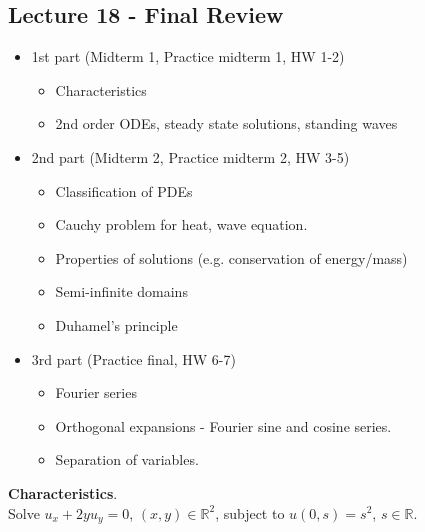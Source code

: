 \documentclass[12pt, letterpaper]{article}
\begin{document}
\subsection{Lecture 18 - Final Review}
\begin{itemize}
    \item 1st part (Midterm 1, Practice midterm 1, HW 1-2)
    \begin{itemize}
        \item Characteristics
        \item 2nd order ODEs, steady state solutions, standing waves
    \end{itemize}
    \item 2nd part (Midterm 2, Practice midterm 2, HW 3-5)
    \begin{itemize}
        \item Classification of PDEs
        \item Cauchy problem for heat, wave equation.
        \item Properties of solutions (e.g. conservation of energy/mass)
        \item Semi-infinite domains
        \item Duhamel's principle
    \end{itemize}
    \item 3rd part (Practice final, HW 6-7)
    \begin{itemize}
        \item Fourier series
        \item Orthogonal expansions - Fourier sine and cosine series.
        \item Separation of variables.
    \end{itemize}
\end{itemize}
\textbf{Characteristics}. \\
 Solve $u_x + 2yu_y = 0$, $(x,y)\in \mathbb{R}^2$, subject to $u(0,s) = s^2$,
$s \in \mathbb{R}$.
\end{document}

